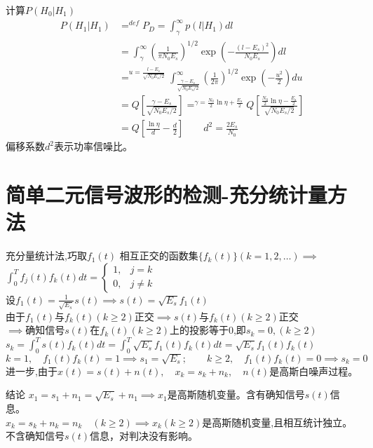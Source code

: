 \begin{frame}{计算$P(H_0|H_1)$}
\begin{align*}
P(H_1|H_1)&\mathop{=}^{def}P_D=\int_{\gamma}^{\infty}p(l|H_1)dl\\
&=\int_{\gamma}^{\infty}\left(\frac{1}{\pi N_0E_s}\right)^{1/2}\exp\left(-\frac{(l-E_s)^2}{N_0E_s}\right)dl\\
&\mathop{=}^{u=\frac{l-E_s}{\sqrt{N_0E_s/2}}}\int_{\frac{\gamma-E_s}{\sqrt{N_0E_s/2}}}^{\infty}\left(\frac{1}{2\pi}\right)^{1/2}\exp\left(-\frac{u^2}{2}\right)du\\
&=Q\left[\frac{\gamma-E_s}{\sqrt{N_0E_s/2}}\right]\mathop{=}^{\gamma=\frac{N_0}{2}\ln\eta+\frac{E_s}{2}}Q\left[\frac{\frac{N_0}{2}\ln\eta-\frac{E_s}{2}}{\sqrt{N_0E_s/2}}\right]\\
&=Q\left[\frac{\ln\eta}{d}-\frac{d}{2}\right]\qquad d^2=\frac{2E_s}{N_0}
\end{align*}
偏移系数$d^2$表示功率信噪比。
\end{frame}

\section{简单二元信号波形的检测-充分统计量方法}

\begin{frame}{充分量统计法,巧取$f_1(t)$}
相互正交的函数集$\{f_k(t)\}(k=1,2,\dots)\implies$
$\int_{0}^{T}f_j(t)f_k(t)dt=
\begin{cases}
1,&j=k\\
0,&j\ne k
\end{cases}
$\\
设$f_1(t)=\frac{1}{\sqrt{E_s}}s(t)\implies s(t)=\sqrt{E_s}f_1(t)$\\
由于$f_1(t)$与$f_k(t)(k\ge 2)$正交$\implies s(t)$与$f_k(t)(k\ge 2)$正交\\
$\implies$确知信号$s(t)$在$f_k(t)(k\ge 2)$上的投影等于0,即$s_k=0,(k\ge 2)$\\
$s_k=\int_{0}^{T}s(t)f_k(t)dt=\int_{0}^{T}\sqrt{E_s}f_1(t)f_k(t)dt=\sqrt{E_s}f_1(t)f_k(t)$\\
$k=1,\quad f_1(t)f_k(t)=1\implies s_1=\sqrt{E_s};\qquad k\ge 2,\quad f_1(t)f_k(t)=0\implies s_k=0$\\
进一步,由于$x(t)=s(t)+n(t),\quad x_k=s_k+n_k,\quad n(t)$是高斯白噪声过程。\\
\begin{block}{结论}
	$x_1=s_1+n_1=\sqrt{E_s}+n_1\implies x_1$是高斯随机变量。含有确知信号$s(t)$信息。\\
	$x_k=s_k+n_k=n_k\quad(k\ge 2)\implies x_k(k\ge 2)$是高斯随机变量,且相互统计独立。不含确知信号$s(t)$信息，对判决没有影响。\\
\end{block}
\end{frame}

